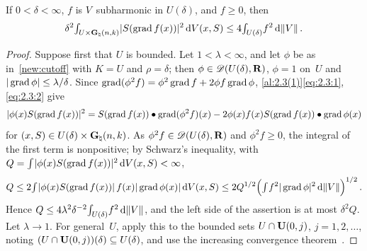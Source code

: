 \begin{lemma}
    \label{al:7.5(5)}
    If $0 < \delta < \infty$, $f$ is $V$~subharmonic in $U(\delta)$, and $f \ge 0$, then
    \begin{displaymath}
        \delta^2 {\textstyle\int_{U \times \mathbf{G}_{\natural}(n,k)}^{}} |S(\operatorname{grad} f(x))|^2 \,\mathrm{d} V(x,S) \le 4
        {\textstyle\int_{U(\delta)}^{}} f^2 \,\mathrm{d} \|V\| \,.
    \end{displaymath}
\end{lemma}

\begin{proof}
    Suppose first that $U$ is bounded. Let $1 < \lambda < \infty$, and let $\phi$ be as
    in~\ref{new:cutoff} with $K = U$ and $\rho = \delta$; then $\phi \in \mathscr{D}(U(\delta),\mathbf{R})$,
    $\phi = 1$ on~$U$ and $|\operatorname{grad} \phi| \le \lambda / \delta$. Since $\operatorname{grad}(\phi^2 f) = \phi^2 \operatorname{grad}
    f + 2 \phi f \operatorname{grad} \phi$, \ref{al:2.3(1)}\eqref{eq:2.3:1},\eqref{eq:2.3:2} give
    \begin{displaymath}
        |\phi(x) S(\operatorname{grad} f(x))|^2 = S(\operatorname{grad} f(x)) \bullet \operatorname{grad}(\phi^2 f)(x) - 2 \phi(x) f(x)
        S(\operatorname{grad} f(x)) \bullet \operatorname{grad} \phi(x)
    \end{displaymath}
    for $(x,S) \in U(\delta) \times \mathbf{G}_{\natural}(n,k)$. As $\phi^2 f \in \mathscr{D}(U(\delta),\mathbf{R})$
    and $\phi^2 f \ge 0$, the integral of the first term is nonpositive; by Schwarz's inequality,
    with $Q = {\textstyle\int_{}^{}} |\phi(x) S(\operatorname{grad} f(x))|^2 \,\mathrm{d} V(x,S) < \infty$,
    \begin{displaymath}
        Q \le 2 {\textstyle\int_{}^{}} |\phi(x) S(\operatorname{grad} f(x))| \, f(x) |\operatorname{grad} \phi(x)| \,\mathrm{d} V(x,S) \le 2
        Q^{1/2} \Big( {\textstyle\int_{}^{}} f^2 |\operatorname{grad} \phi|^2 \,\mathrm{d} \|V\| \Big)^{1/2} \,.
    \end{displaymath}
    Hence $Q \le 4 \lambda^2 \delta^{-2} {\textstyle\int_{U(\delta)}^{}} f^2 \,\mathrm{d} \|V\|$, and the left side of
    the assertion is at most $\delta^2 Q$. Let $\lambda \to 1$. For general~$U$, apply this to the
    bounded sets $U \cap \mathbf{U}(0,j)$, $j = 1, 2, \ldots$, noting $(U \cap \mathbf{U}(0,j))(\delta)
    \subseteq U(\delta)$, and use the increasing convergence theorem~\cite[2.4.7]{Federer1969}.
\end{proof}

